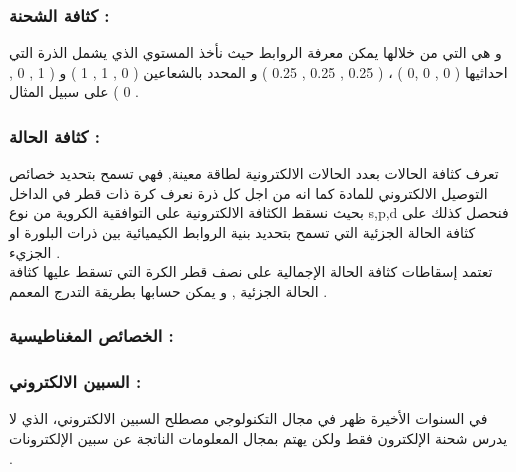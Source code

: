 					\subsubsection*{كثافة الشحنة :}
		 و هي التي من خلالها يمكن معرفة الروابط حيث نأخذ المستوي الذي يشمل الذرة التي احداثيها ( 0 , 0 ,0 ) ، ( 0.25 , 0.25 , 0.25 ) و المحدد بالشعاعين ( 0 , 1 , 1 ) و ( 1 , 0 , 0 )  على سبيل المثال .
		
							\subsubsection*{كثافة الحالة :}
		 تعرف كثافة الحالات بعدد الحالات الالكترونية لطاقة معينة, فهي تسمح بتحديد خصائص التوصيل الالكتروني للمادة كما انه من اجل كل ذرة نعرف كرة ذات قطر في الداخل بحيث نسقط الكثافة الالكترونية على التوافقية الكروية من نوع s,p,d فنحصل كذلك على كثافة الحالة الجزئية التي تسمح بتحديد بنية الروابط الكيميائية بين ذرات البلورة او الجزيء .\\
		تعتمد إسقاطات كثافة الحالة الإجمالية على نصف قطر الكرة التي تسقط عليها كثافة الحالة الجزئية , و يمكن حسابها بطريقة التدرج المعمم .
	
		\subsubsection{الخصائص المغناطيسية : }
		\subsubsection*{السبين الالكتروني : }
	 
	في السنوات الأخيرة ظهر في مجال التكنولوجي مصطلح السبين الالكتروني، الذي لا يدرس شحنة الإلكترون فقط ولكن يهتم بمجال المعلومات الناتجة عن سبين الإلكترونات .
	
